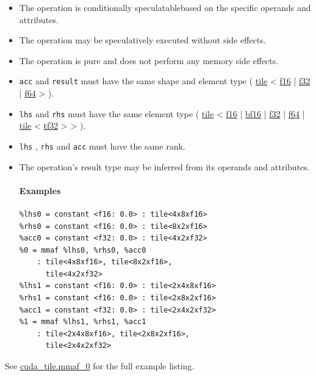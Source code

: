 \documentclass{article}
\begin{document}
\begin{itemize}
\item The operation is conditionally speculatablebased on the specific operands and attributes.
\item The operation may be speculatively executed without side effects.
\item The operation is pure and does not perform any memory side effects.
\item \texttt{acc} and \texttt{result} must have the same shape and element type ( \href{https://docs.nvidia.com/cuda/tile-ir/latest/sections/types.html#type-tile}{tile} < \href{https://docs.nvidia.com/cuda/tile-ir/latest/sections/types.html#subsection-element-types}{f16} | \href{https://docs.nvidia.com/cuda/tile-ir/latest/sections/types.html#subsection-element-types}{f32} | \href{https://docs.nvidia.com/cuda/tile-ir/latest/sections/types.html#subsection-element-types}{f64} > ).
\item \texttt{lhs} and \texttt{rhs} must have the same element type ( \href{https://docs.nvidia.com/cuda/tile-ir/latest/sections/types.html#type-tile}{tile} < \href{https://docs.nvidia.com/cuda/tile-ir/latest/sections/types.html#subsection-element-types}{f16} | \href{https://docs.nvidia.com/cuda/tile-ir/latest/sections/types.html#subsection-element-types}{bf16} | \href{https://docs.nvidia.com/cuda/tile-ir/latest/sections/types.html#subsection-element-types}{f32} | \href{https://docs.nvidia.com/cuda/tile-ir/latest/sections/types.html#subsection-element-types}{f64} | \href{https://docs.nvidia.com/cuda/tile-ir/latest/sections/types.html#type-tile}{tile} < \href{https://docs.nvidia.com/cuda/tile-ir/latest/sections/types.html#subsection-element-types}{tf32} > > ).
\item \texttt{lhs} , \texttt{rhs} and \texttt{acc} must have the same rank.
\item The operation's result type may be inferred from its operands and attributes.


\paragraph{Examples}

\begin{lstlisting}
%lhs0 = constant <f16: 0.0> : tile<4x8xf16>
%rhs0 = constant <f16: 0.0> : tile<8x2xf16>
%acc0 = constant <f32: 0.0> : tile<4x2xf32>
%0 = mmaf %lhs0, %rhs0, %acc0
    : tile<4x8xf16>, tile<8x2xf16>,
      tile<4x2xf32>
%lhs1 = constant <f16: 0.0> : tile<2x4x8xf16>
%rhs1 = constant <f16: 0.0> : tile<2x8x2xf16>
%acc1 = constant <f32: 0.0> : tile<2x4x2xf32>
%1 = mmaf %lhs1, %rhs1, %acc1
    : tile<2x4x8xf16>, tile<2x8x2xf16>,
      tile<2x4x2xf32>
\end{lstlisting}

\end{itemize}
See \href{https://docs.nvidia.com/cuda/tile-ir/latest/sections/appendix.html#example-cuda-tile-mmaf-0}{cuda\_tile.mmaf\_0} for the full example listing.
\end{document}
